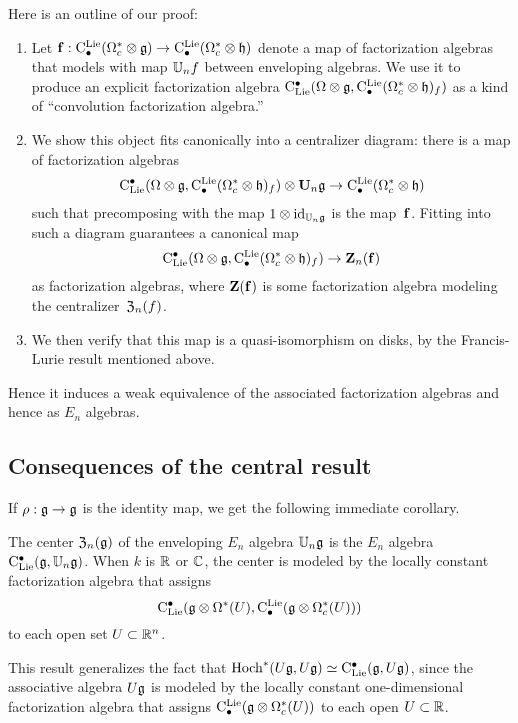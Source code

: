 \documentclass[11pt]{amsart}
\numberwithin{equation}{section}
\begin{document}
Here is an outline of our proof:
\begin{enumerate}
\item Let ${\bf f}: {\rm C}^{\rm Lie}_\bullet(\Omega_c^* \otimes \mathfrak g) \to {\rm C}^{\rm Lie}_\bullet(\Omega_c^* \otimes \mathfrak h)$ denote a map of factorization algebras that models with map $\mathbb U_n f$ between enveloping algebras. 
We use it to produce an explicit factorization algebra ${\rm C}_{\rm Lie}^\bullet(\Omega \otimes \mathfrak g, {\rm C}^{\rm Lie}_\bullet(\Omega_c^* \otimes \mathfrak h)_f)$ as a kind of ``convolution factorization algebra.'' 
\item We show this object fits canonically into a centralizer diagram: there is a map of factorization algebras
\[
{\rm C}_{\rm Lie}^\bullet(\Omega \otimes \mathfrak g, {\rm C}^{\rm Lie}_\bullet(\Omega_c^* \otimes \mathfrak h)_f) \otimes \mathbf U_n \mathfrak g \to {\rm C}^{\rm Lie}_\bullet(\Omega_c^* \otimes \mathfrak h)
\]
such that precomposing with the map $1 \otimes {\rm id}_{\mathbb U_n \mathfrak g}$ is the map~${\bf f}$.
Fitting into such a diagram guarantees a canonical map 
\[
{\rm C}_{\rm Lie}^\bullet(\Omega \otimes \mathfrak g, {\rm C}^{\rm Lie}_\bullet(\Omega_c^* \otimes \mathfrak h)_f) \to \mathbf Z_n({\bf f})
\]
as factorization algebras, where $\mathbf Z({\bf f})$ is some factorization algebra modeling the centralizer~${\frak Z}_n(f)$. 
\item We then verify that this map is a quasi-isomorphism on disks, by the Francis-Lurie result mentioned above. 
\end{enumerate}
Hence it induces a weak equivalence of the associated factorization algebras and hence as $E_n$ algebras. 

\subsection{Consequences of the central result}

If $\rho: \mathfrak g \to \mathfrak g$ is the identity map, we get the following immediate corollary.

\begin{cor}
\label{thm: center}
The center ${\frak Z}_n(\mathfrak g)$ of the enveloping $E_n$ algebra $\mathbb U_n\mathfrak g$ is the $E_n$ algebra ${\rm C}_{\rm Lie}^\bullet(\mathfrak g, \mathbb U_n\mathfrak g)$. 
When $k$ is $\mathbb R$ or $\mathbb C$, the 
center is modeled by the locally constant factorization algebra that assigns
\[
{\rm C}_{\rm Lie}^\bullet(\mathfrak g \otimes \Omega^*(U), {\rm C}^{\rm Lie}_\bullet( \mathfrak g \otimes \Omega^*_c(U)))
\]
to each open set $U \subset \mathbb R^n$.
\end{cor}

This result generalizes the fact that ${\rm Hoch}^*(U\mathfrak g,U\mathfrak g) \simeq {\rm C}_{\rm Lie}^\bullet(\mathfrak g, U\mathfrak g)$, 
since the associative algebra $U\mathfrak g$ is modeled by the locally constant one-dimensional factorization algebra that assigns
${\rm C}^{\rm Lie}_\bullet (\mathfrak g \otimes \Omega^*_c(U))$ to each open $U \subset \mathbb R$. 
\end{document}
